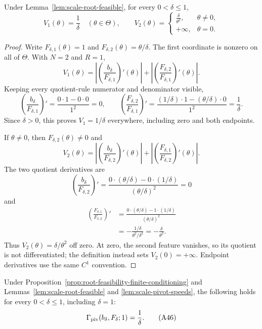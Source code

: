 \begin{lemma}
\label{lem:scale-pivot-speeds}
Under Lemma~\ref{lem:scale-root-feasible}, for every $0<\delta\leq1$,
\[
V_1(\theta)=\frac1\delta\quad(\theta\in\Theta),
\qquad
V_2(\theta)=
\begin{cases}
\displaystyle\frac\delta{\theta^2},&\theta\neq0,\\
+\infty,&\theta=0.
\end{cases}
\tag{A45}
\]
\end{lemma}

\begin{proof}
Write
$F_{\delta,1}(\theta)=1$ and
$F_{\delta,2}(\theta)=\theta/\delta$.  The first coordinate is nonzero on
all of $\Theta$.  With $N=2$ and $R=1$,
\[
V_1(\theta)=
\left|\left(\frac{b_\delta}{F_{\delta,1}}\right)'(\theta)\right|
+\left|\left(\frac{F_{\delta,2}}{F_{\delta,1}}\right)'(\theta)\right|.
\]
Keeping every quotient-rule numerator and denominator visible,
\[
\left(\frac{b_\delta}{F_{\delta,1}}\right)'
=\frac{0\cdot1-0\cdot0}{1^2}=0,
\qquad
\left(\frac{F_{\delta,2}}{F_{\delta,1}}\right)'
=\frac{(1/\delta)\cdot1-(\theta/\delta)\cdot0}{1^2}
=\frac1\delta.
\]
Since $\delta>0$, this proves $V_1=1/\delta$ everywhere, including zero
and both endpoints.

If $\theta\neq0$, then $F_{\delta,2}(\theta)\neq0$ and
\[
V_2(\theta)=
\left|\left(\frac{b_\delta}{F_{\delta,2}}\right)'(\theta)\right|
+\left|\left(\frac{F_{\delta,1}}{F_{\delta,2}}\right)'(\theta)\right|.
\]
The two quotient derivatives are
\[
\left(\frac{b_\delta}{F_{\delta,2}}\right)'
=\frac{0\cdot(\theta/\delta)-0\cdot(1/\delta)}
{(\theta/\delta)^2}=0
\]
and
\[
\begin{aligned}
\left(\frac{F_{\delta,1}}{F_{\delta,2}}\right)'
&=\frac{0\cdot(\theta/\delta)-1\cdot(1/\delta)}
{(\theta/\delta)^2}\\
&=-\frac{1/\delta}{\theta^2/\delta^2}
=-\frac\delta{\theta^2}.
\end{aligned}
\]
Thus $V_2(\theta)=\delta/\theta^2$ off zero.  At zero, the second feature
vanishes, so its quotient is not differentiated; the definition instead
sets $V_2(0)=+\infty$.  Endpoint derivatives use the same $C^1$
convention.
\end{proof}

\begin{proposition}
\label{prop:scale-stress-specialization}
Under Proposition~\ref{prop:root-feasibility-finite-conditioning} and
Lemmas~\ref{lem:scale-root-feasible} and \ref{lem:scale-pivot-speeds}, the
following holds for every $0<\delta\leq1$, including $\delta=1$:
\[
\Gamma_{\rm piv}(b_\delta,F_\delta;1)=\frac1\delta.
\tag{A46}
\]
\end{proposition}


